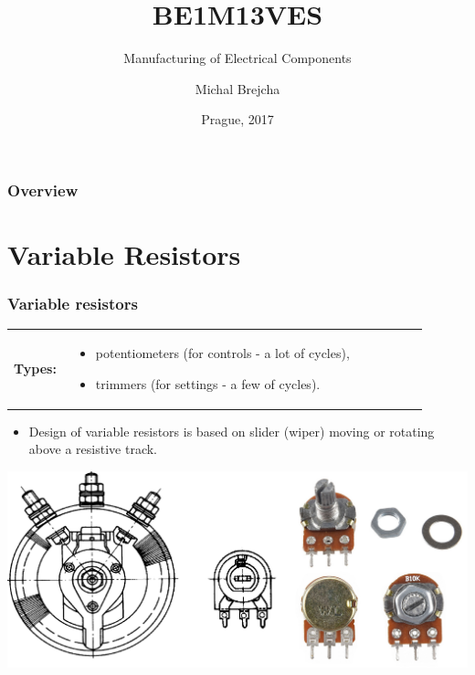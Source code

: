 \documentclass{beamer}
\title[BE1M13VES]{BE1M13VES}
\subtitle[Manufacturing of Electrical Components] {Manufacturing of Electrical Components}
\author[Brejcha]{Michal Brejcha}
\institute[CTU]{CTU in Prague}
\date[Prague, 2017]{Prague, 2017}
\begin{document}
\frame{\titlepage}

\begin{frame}
\frametitle{Overview} 
\tableofcontents
\end{frame}


\section{\texorpdfstring{Variable Resistors}{Resistance value}}
	\begin{frame}
    \frametitle{Variable resistors}
		\begin{center}
		\begin{tabular}{p{0.12\linewidth} p{0.78\linewidth}}
			\textbf{Types:} 					& 
			\begin{itemize}
				\item potentiometers (for controls - a lot of cycles),
				\item trimmers (for settings - a few of cycles).
			\end{itemize}
		\end{tabular}
		\end{center}
		
		\begin{itemize}
			\item Design of variable resistors is based on slider (wiper) moving or rotating above a resistive track.
		\end{itemize}
		\begin{center}
		\includegraphics[scale=0.2]{obr01_potTrim.png}
		\end{center}
  \end{frame}
\end{document}
